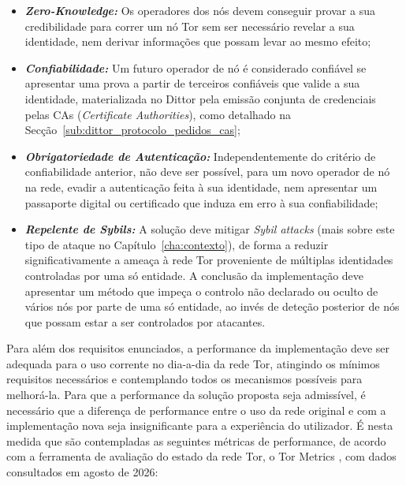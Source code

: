 \begin{itemize}
    \item \textbf{\textit{Zero-Knowledge:}} Os operadores dos nós devem conseguir provar a sua credibilidade para correr um nó Tor sem ser necessário revelar a sua identidade, nem derivar informações que possam levar ao mesmo efeito;
    \item \textbf{\textit{Confiabilidade:}} Um futuro operador de nó é considerado confiável se apresentar uma prova a partir de terceiros confiáveis que valide a sua identidade, materializada no Dittor pela emissão conjunta de credenciais pelas CAs (\textit{Certificate Authorities}), como detalhado na Secção~\ref{sub:dittor_protocolo_pedidos_cas};
    \item \textbf{\textit{Obrigatoriedade de Autenticação:}} Independentemente do critério de confiabilidade anterior, não deve ser possível, para um novo operador de nó na rede, evadir a autenticação feita à sua identidade, nem apresentar um passaporte digital ou certificado que induza em erro à sua confiabilidade;
    \item \textbf{\textit{Repelente de Sybils:}} A solução deve mitigar \textit{Sybil attacks} (mais sobre este tipo de ataque no Capítulo~\ref{cha:contexto}), de forma a reduzir significativamente a ameaça à rede Tor proveniente de múltiplas identidades controladas por uma só entidade. A conclusão da implementação deve apresentar um método que impeça o controlo não declarado ou oculto de vários nós por parte de uma só entidade, ao invés de deteção posterior de nós que possam estar a ser controlados por atacantes.
\end{itemize}

Para além dos requisitos enunciados, a performance da implementação deve ser adequada para o uso corrente no dia-a-dia da rede Tor, atingindo os mínimos requisitos necessários e contemplando todos os mecanismos possíveis para melhorá-la. Para que a performance da solução proposta seja admissível, é necessário que a diferença de performance entre o uso da rede original e com a implementação nova seja insignificante para a experiência do utilizador. É nesta medida que são contempladas as seguintes métricas de performance, de acordo com a ferramenta de avaliação do estado da rede Tor, o Tor Metrics \cite{tormetrics}, com dados consultados em agosto de 2026:

